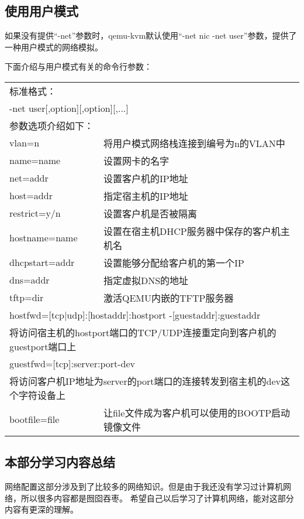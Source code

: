 \documentclass[a4paper,left=2.5cm,right=2.5cm,11pt]{article}
\newcommand{\interval}{\vspace{0.5em}}
\begin{document}
\subsection{使用用户模式}
	如果没有提供“-net”参数时，qemu-kvm默认使用“-net nic -net user”参数，提供了一种用户模式的网络模拟。\par
	下面介绍与用户模式有关的命令行参数：
	\interval
	\begin{longtable}{p{3.5cm}p{10cm}}
	\hline
	标准格式： & \\
	\multicolumn{2}{l}{-net user[,option][,option][,...]} \\
	\hline
	参数选项介绍如下： & \\
	\hline
	vlan=n & 将用户模式网络栈连接到编号为n的VLAN中 \\
	\hline
	name=name & 设置网卡的名字 \\
	\hline
	net=addr & 设置客户机的IP地址 \\
	\hline
	host=addr & 指定宿主机的IP地址 \\
	\hline
	restrict=y/n & 设置客户机是否被隔离 \\
	\hline
	hostname=name & 设置在宿主机DHCP服务器中保存的客户机主机名 \\
	\hline
	dhcpstart=addr & 设置能够分配给客户机的第一个IP \\
	\hline
	dns=addr & 指定虚拟DNS的地址 \\
	\hline
	tftp=dir & 激活QEMU内嵌的TFTP服务器 \\
	\hline
	\multicolumn{2}{l}{hostfwd=[tcp|udp]:[hostaddr]:hostport -[guestaddr]:guestaddr} \\
	\multicolumn{2}{l}{将访问宿主机的hostport端口的TCP/UDP连接重定向到客户机的guestport端口上} \\
	\hline
	\multicolumn{2}{l}{guestfwd=[tcp]:server:port-dev} \\
	\multicolumn{2}{l}{将访问客户机IP地址为server的port端口的连接转发到宿主机的dev这个字符设备上} \\
	\hline
	bootfile=file & 让file文件成为客户机可以使用的BOOTP启动镜像文件 \\
	\hline
	\end{longtable}

\subsection{本部分学习内容总结}
	网络配置这部分涉及到了比较多的网络知识。但是由于我还没有学习过计算机网络，所以很多内容都是囫囵吞枣。
	希望自己以后学习了计算机网络，能对这部分内容有更深的理解。
\end{document}
